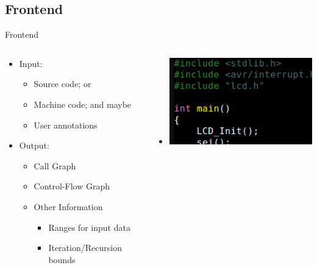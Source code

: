 \documentclass{beamer}
\begin{document}
\subsection{Frontend}
\begin{frame}{Frontend}
  \begin{columns}
    \begin{column}{0.6\textwidth}
      \begin{itemize}
        \item<1-> Input:
          \begin{itemize}
            \item Source code; or
            \item Machine code; and maybe
            \item User annotations
          \end{itemize}
        \item<2-> Output:
          \begin{itemize}
            \item Call Graph
            \item Control-Flow Graph
            \item Other Information
              \begin{itemize}
              \item Ranges for input data
              \item Iteration/Recursion bounds
              \end{itemize}
          \end{itemize}
      \end{itemize}
    \end{column}
    \begin{column}{0.4\textwidth}
      \begin{center}
        \begin{itemize}
          \item<1->[] \includegraphics[scale=0.3]{code.png}

\end{itemize}
\end{center}
\end{column}
\end{columns}
\end{frame}
\end{document}
